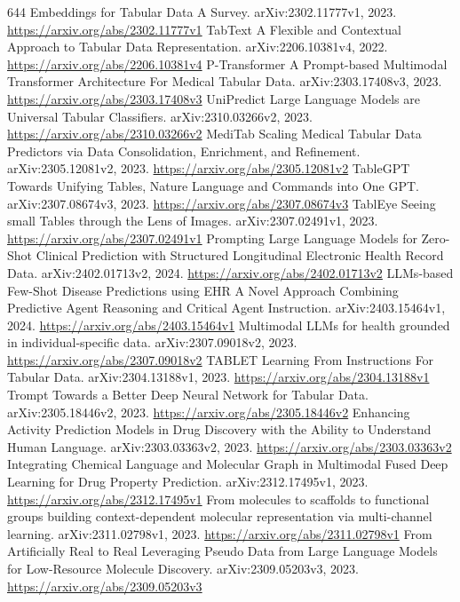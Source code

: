 \documentclass[11pt]{article}
\begin{document}
\begin{thebibliography}{644}
 Embeddings for Tabular Data A Survey. arXiv:2302.11777v1, 2023. \url{https://arxiv.org/abs/2302.11777v1}
 TabText A Flexible and Contextual Approach to Tabular Data Representation. arXiv:2206.10381v4, 2022. \url{https://arxiv.org/abs/2206.10381v4}
 P-Transformer A Prompt-based Multimodal Transformer Architecture For Medical Tabular Data. arXiv:2303.17408v3, 2023. \url{https://arxiv.org/abs/2303.17408v3}
 UniPredict Large Language Models are Universal Tabular Classifiers. arXiv:2310.03266v2, 2023. \url{https://arxiv.org/abs/2310.03266v2}
 MediTab Scaling Medical Tabular Data Predictors via Data Consolidation, Enrichment, and Refinement. arXiv:2305.12081v2, 2023. \url{https://arxiv.org/abs/2305.12081v2}
 TableGPT Towards Unifying Tables, Nature Language and Commands into One GPT. arXiv:2307.08674v3, 2023. \url{https://arxiv.org/abs/2307.08674v3}
 TablEye Seeing small Tables through the Lens of Images. arXiv:2307.02491v1, 2023. \url{https://arxiv.org/abs/2307.02491v1}
 Prompting Large Language Models for Zero-Shot Clinical Prediction with Structured Longitudinal Electronic Health Record Data. arXiv:2402.01713v2, 2024. \url{https://arxiv.org/abs/2402.01713v2}
 LLMs-based Few-Shot Disease Predictions using EHR A Novel Approach Combining Predictive Agent Reasoning and Critical Agent Instruction. arXiv:2403.15464v1, 2024. \url{https://arxiv.org/abs/2403.15464v1}
 Multimodal LLMs for health grounded in individual-specific data. arXiv:2307.09018v2, 2023. \url{https://arxiv.org/abs/2307.09018v2}
 TABLET Learning From Instructions For Tabular Data. arXiv:2304.13188v1, 2023. \url{https://arxiv.org/abs/2304.13188v1}
 Trompt Towards a Better Deep Neural Network for Tabular Data. arXiv:2305.18446v2, 2023. \url{https://arxiv.org/abs/2305.18446v2}
 Enhancing Activity Prediction Models in Drug Discovery with the Ability to Understand Human Language. arXiv:2303.03363v2, 2023. \url{https://arxiv.org/abs/2303.03363v2}
 Integrating Chemical Language and Molecular Graph in Multimodal Fused Deep Learning for Drug Property Prediction. arXiv:2312.17495v1, 2023. \url{https://arxiv.org/abs/2312.17495v1}
 From molecules to scaffolds to functional groups building context-dependent molecular representation via multi-channel learning. arXiv:2311.02798v1, 2023. \url{https://arxiv.org/abs/2311.02798v1}
 From Artificially Real to Real Leveraging Pseudo Data from Large Language Models for Low-Resource Molecule Discovery. arXiv:2309.05203v3, 2023. \url{https://arxiv.org/abs/2309.05203v3}

\end{thebibliography}
\end{document}
